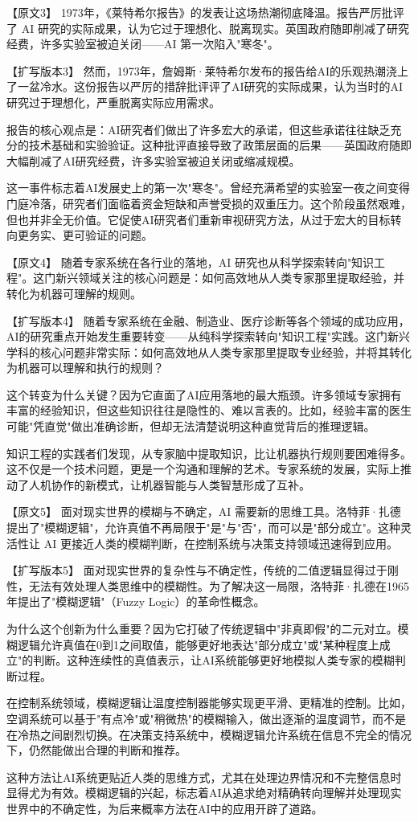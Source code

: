 【原文3】
1973年，《莱特希尔报告》的发表让这场热潮彻底降温。报告严厉批评了 AI 研究的实际成果，认为它过于理想化、脱离现实。英国政府随即削减了研究经费，许多实验室被迫关闭——AI 第一次陷入"寒冬"。

【扩写版本3】
然而，1973年，詹姆斯·莱特希尔发布的报告给AI的乐观热潮浇上了一盆冷水。这份报告以严厉的措辞批评评了AI研究的实际成果，认为当时的AI研究过于理想化，严重脱离实际应用需求。

报告的核心观点是：AI研究者们做出了许多宏大的承诺，但这些承诺往往缺乏充分的技术基础和实验验证。这种批评直接导致了政策层面的后果——英国政府随即大幅削减了AI研究经费，许多实验室被迫关闭或缩减规模。

这一事件标志着AI发展史上的第一次"寒冬"。曾经充满希望的实验室一夜之间变得门庭冷落，研究者们面临着资金短缺和声誉受损的双重压力。这个阶段虽然艰难，但也并非全无价值。它促使AI研究者们重新审视研究方法，从过于宏大的目标转向更务实、更可验证的问题。

【原文4】
随着专家系统在各行业的落地，AI 研究也从科学探索转向"知识工程"。这门新兴领域关注的核心问题是：如何高效地从人类专家那里提取经验，并转化为机器可理解的规则。

【扩写版本4】
随着专家系统在金融、制造业、医疗诊断等各个领域的成功应用，AI的研究重点开始发生重要转变——从纯科学探索转向"知识工程"实践。这门新兴学科的核心问题非常实际：如何高效地从人类专家那里提取专业经验，并将其转化为机器可以理解和执行的规则？

这个转变为什么关键？因为它直面了AI应用落地的最大瓶颈。许多领域专家拥有丰富的经验知识，但这些知识往往是隐性的、难以言表的。比如，经验丰富的医生可能"凭直觉"做出准确诊断，但却无法清楚说明这种直觉背后的推理逻辑。

知识工程的实践者们发现，从专家脑中提取知识，比让机器执行规则要困难得多。这不仅是一个技术问题，更是一个沟通和理解的艺术。专家系统的发展，实际上推动了人机协作的新模式，让机器智能与人类智慧形成了互补。

【原文5】
面对现实世界的模糊与不确定，AI 需要新的思维工具。洛特菲·扎德提出了"模糊逻辑"，允许真值不再局限于"是"与"否"，而可以是"部分成立"。这种灵活性让 AI 更接近人类的模糊判断，在控制系统与决策支持领域迅速得到应用。

【扩写版本5】
面对现实世界的复杂性与不确定性，传统的二值逻辑显得过于刚性，无法有效处理人类思维中的模糊性。为了解决这一局限，洛特菲·扎德在1965年提出了"模糊逻辑"（Fuzzy Logic）的革命性概念。

为什么这个创新为什么重要？因为它打破了传统逻辑中"非真即假"的二元对立。模糊逻辑允许真值在0到1之间取值，能够更好地表达"部分成立"或"某种程度上成立"的判断。这种连续性的真值表示，让AI系统能够更好地模拟人类专家的模糊判断过程。

在控制系统领域，模糊逻辑让温度控制器能够实现更平滑、更精准的控制。比如，空调系统可以基于"有点冷"或"稍微热"的模糊输入，做出逐渐的温度调节，而不是在冷热之间剧烈切换。在决策支持系统中，模糊逻辑允许系统在信息不完全的情况下，仍然能做出合理的判断和推荐。

这种方法让AI系统更贴近人类的思维方式，尤其在处理边界情况和不完整信息时显得尤为有效。模糊逻辑的兴起，标志着AI从追求绝对精确转向理解并处理现实世界中的不确定性，为后来概率方法在AI中的应用开辟了道路。
